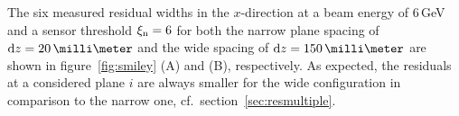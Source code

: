 The six measured residual widths in the $x$-direction at a beam energy of 6\,GeV and a sensor threshold $\xi_{\textrm{n}} = 6$ for both the narrow plane spacing of $\dz = 20\,\milli\meter$
 and the wide spacing of $\dz = 150\,\milli\meter$ are shown in figure~\ref{fig:smiley} (A) and (B), respectively. 
As expected, the residuals at a considered plane $i$ are always smaller for the wide configuration in comparison to the narrow one, cf.~section~\ref{sec:resmultiple}.


%


